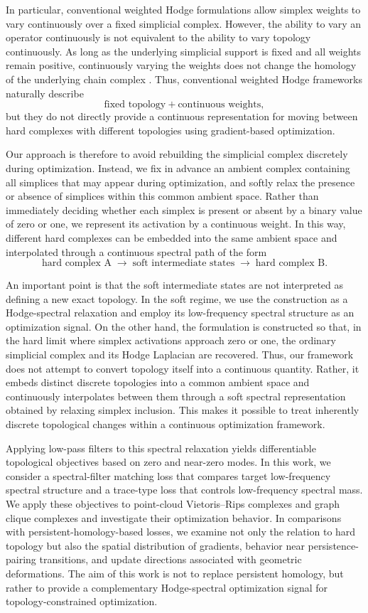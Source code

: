 \documentclass[pdflatex,sn-mathphys-num]{sn-jnl}%
\theoremstyle{thmstyleone}%
\theoremstyle{thmstyletwo}%
\theoremstyle{thmstylethree}%
\begin{document}
In particular, conventional weighted Hodge formulations allow simplex weights to vary continuously over a fixed simplicial complex. However, the ability to vary an operator continuously is not equivalent to the ability to vary topology continuously. As long as the underlying simplicial support is fixed and all weights remain positive, continuously varying the weights does not change the homology of the underlying chain complex \cite{guglielmi2023quantifying,ren2021weighted}. Thus, conventional weighted Hodge frameworks naturally describe
\[
\text{fixed topology} + \text{continuous weights},
\]
but they do not directly provide a continuous representation for moving between hard complexes with different topologies using gradient-based optimization.

Our approach is therefore to avoid rebuilding the simplicial complex discretely during optimization. Instead, we fix in advance an ambient complex containing all simplices that may appear during optimization, and softly relax the presence or absence of simplices within this common ambient space. Rather than immediately deciding whether each simplex is present or absent by a binary value of zero or one, we represent its activation by a continuous weight. In this way, different hard complexes can be embedded into the same ambient space and interpolated through a continuous spectral path of the form
\[
\text{hard complex A}
\;\longrightarrow\;
\text{soft intermediate states}
\;\longrightarrow\;
\text{hard complex B}.
\]

An important point is that the soft intermediate states are not interpreted as defining a new exact topology. In the soft regime, we use the construction as a Hodge-spectral relaxation and employ its low-frequency spectral structure as an optimization signal. On the other hand, the formulation is constructed so that, in the hard limit where simplex activations approach zero or one, the ordinary simplicial complex and its Hodge Laplacian are recovered. Thus, our framework does not attempt to convert topology itself into a continuous quantity. Rather, it embeds distinct discrete topologies into a common ambient space and continuously interpolates between them through a soft spectral representation obtained by relaxing simplex inclusion. This makes it possible to treat inherently discrete topological changes within a continuous optimization framework.

Applying low-pass filters to this spectral relaxation yields differentiable topological objectives based on zero and near-zero modes. In this work, we consider a spectral-filter matching loss that compares target low-frequency spectral structure and a trace-type loss that controls low-frequency spectral mass. We apply these objectives to point-cloud Vietoris--Rips complexes and graph clique complexes and investigate their optimization behavior. In comparisons with persistent-homology-based losses, we examine not only the relation to hard topology but also the spatial distribution of gradients, behavior near persistence-pairing transitions, and update directions associated with geometric deformations. The aim of this work is not to replace persistent homology, but rather to provide a complementary Hodge-spectral optimization signal for topology-constrained optimization.
\end{document}

